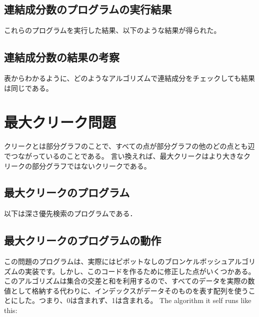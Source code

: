 \documentclass[a4j, titlepage]{jarticle}
\begin{document}
    \subsection{連結成分数のプログラムの実行結果}
    これらのプログラムを実行した結果、以下のような結果が得られた。
    
    \subsection{連結成分数の結果の考察}
    表からわかるように、どのようなアルゴリズムで連結成分をチェックしても結果は同じである。
    
\section{最大クリーク問題}
クリークとは部分グラフのことで、すべての点が部分グラフの他のどの点とも辺でつながっているのことである。
言い換えれば、最大クリークはより大きなクリークの部分グラフではないクリークである。

    \subsection{最大クリークのプログラム}
    以下は深さ優先検索のプログラムである．
        
    \subsection{最大クリークのプログラムの動作}
    この問題のプログラムは、実際にはピボットなしのブロンケルボッシュアルゴリズムの実装です。しかし、このコードを作るために修正した点がいくつかある。このアルゴリズムは集合の交差と和を利用するので、すべてのデータを実際の数値として格納する代わりに、インデックスがデータそのものを表す配列を使うことにした。つまり、0は含まれず、1は含まれる。
    The algorithm it self runs like this:
    
\end{document}
